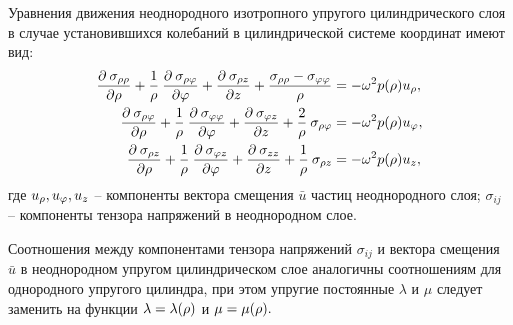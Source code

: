 Уравнения движения неоднородного изотропного упругого цилиндрического слоя в случае установившихся колебаний в цилиндрической системе координат имеют вид:
\begin{equation}\label{equation_dvij_splosh_sred}
\begin{aligned}
\frac{\partial\:\sigma_{\rho\rho}}{
\partial \rho}+\frac{1}{\rho}\:\frac{\partial\:\sigma_{\rho\varphi}}{\partial\varphi}+\frac{\partial\:\sigma_{\rho z}}{\partial z}+\frac{\sigma_{\rho\rho}-\sigma_{\varphi\varphi}}{\rho}&=-\omega^2 p(\rho)u_{\rho},\\
\frac{\partial\:\sigma_{\rho\varphi}}{
\partial \rho}+\frac{1}{\rho}\:\frac{\partial\:\sigma_{\varphi\varphi}}{\partial\varphi}+\frac{\partial\:\sigma_{\varphi z}}{\partial z}+\frac{2}{\rho}\:\sigma_{\rho\varphi}&=-\omega^2 p(\rho)u_{\varphi},\\
\frac{\partial\:\sigma_{\rho z}}{
\partial \rho}+\frac{1}{\rho}\:\frac{\partial\:\sigma_{\varphi z}}{\partial\varphi}+\frac{\partial\:\sigma_{zz}}{\partial z}+\frac{1}{\rho}\:\sigma_{\rho z}&=-\omega^2 p(\rho)u_z,
\end{aligned}
\end{equation}
где $u_{\rho}, u_{\varphi}, u_z$ -- компоненты вектора смещения $\bar{u}$ частиц неоднородного слоя; 
\newline
$\sigma_{ij}$ -- компоненты тензора напряжений в неоднородном слое.

Соотношения между компонентами тензора напряжений $\sigma_{ij}$ и вектора смещения $\bar{u}$ в неоднородном упругом цилиндрическом слое аналогичны соотношениям для однородного упругого цилиндра, при этом упругие постоянные $\lambda$ и $\mu$ следует заменить на функции $\lambda=\lambda(\rho)$ и $\mu=\mu(\rho).$


